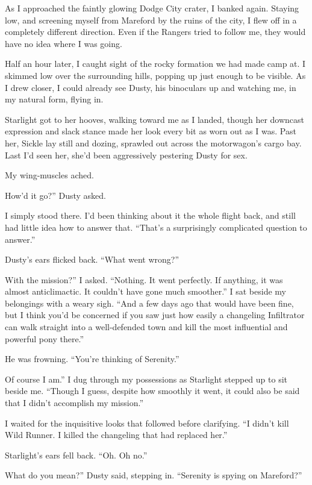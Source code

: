 As I approached the faintly glowing Dodge City crater, I banked again. Staying low, and screening myself from Mareford by the ruins of the city, I flew off in a completely different direction. Even if the Rangers tried to follow me, they would have no idea where I was going.

{\br}%
Half an hour later, I caught sight of the rocky formation we had made camp at. I skimmed low over the surrounding hills, popping up just enough to be visible. As I drew closer, I could already see Dusty, his binoculars up and watching me, in my natural form, flying in.

Starlight got to her hooves, walking toward me as I landed, though her downcast expression and slack stance made her look every bit as worn out as I was. Past her, Sickle lay still and dozing, sprawled out across the motorwagon’s cargo bay. Last I’d seen her, she’d been aggressively pestering Dusty for sex.

My wing-muscles ached.

\leavevmode{}How’d it go?” Dusty asked.

I simply stood there. I’d been thinking about it the whole flight back, and still had little idea how to answer that. “That’s a surprisingly complicated question to answer.”

Dusty’s ears flicked back. “What went wrong?”

\leavevmode{}With the mission?” I asked. “Nothing. It went perfectly. If anything, it was almost anticlimactic. It couldn’t have gone much smoother.” I sat beside my belongings with a weary sigh. “And a few days ago that would have been fine, but I think you’d be concerned if you saw just how easily a changeling Infiltrator can walk straight into a well-defended town and kill the most influential and powerful pony there.”

He was frowning. “You’re thinking of Serenity.”

\leavevmode{}Of course I am.” I dug through my possessions as Starlight stepped up to sit beside me. “Though I guess, despite how smoothly it went, it could also be said that I didn’t accomplish my mission.”

I waited for the inquisitive looks that followed before clarifying. “I didn’t kill Wild Runner. I killed the changeling that had replaced her.”

Starlight’s ears fell back. “Oh. Oh no.”

\leavevmode{}What do you mean?” Dusty said, stepping in. “Serenity is spying on Mareford?”

